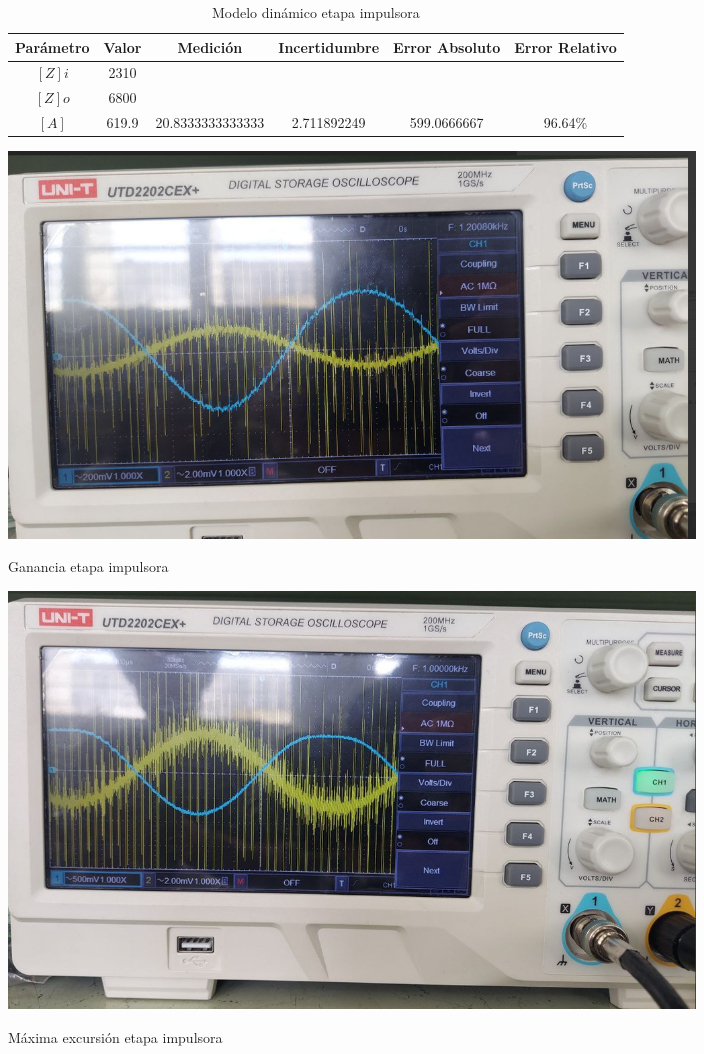 \begin{table}[h!]
\centering
\begin{tabular}{|c|c|c|c|c|c|}
\hline
\textbf{Parámetro} & \textbf{Valor} & \textbf{Medición} & \textbf{Incertidumbre} & \textbf{Error Absoluto} & \textbf{Error Relativo} \\ \hline
$[Z] i$ & 2310 & & & & \\ \hline
$[Z] o$ & 6800 & & & & \\ \hline
$[A]$ & 619.9 & 20.8333333333333 & 2.711892249 & 599.0666667 & 96.64\% \\ \hline
\end{tabular}
\caption{Modelo dinámico etapa impulsora}
\label{tab:med-modelo-dinamico-etapa-impulsora}
\end{table}

\begin{ilustracion}
    \centering
    \includegraphics[width=0.8\textwidth]{src/images/resultados/p3/ganancia-etapa-impulsora.png}
    \caption{Ganancia etapa impulsora}
    \label{ilus:ganancia-etapa-impulsora}
\end{ilustracion}

\begin{ilustracion}
    \centering
    \includegraphics[width=0.8\textwidth]{src/images/resultados/p3/max-excursion-etapa-impulsora.png}
    \caption{Máxima excursión etapa impulsora}
    \label{ilus:max-excursion-etapa-impulsora}
\end{ilustracion}

